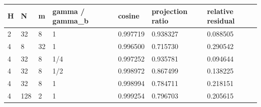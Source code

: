 \begin{tabular}{lllllll}
H & N & m & gamma / gamma\_b & cosine & projection ratio & relative residual \\
\hline
2 & 32 & 8 & 1 & 0.997719 & 0.938327 & 0.088505 \\
4 & 8 & 32 & 1 & 0.996500 & 0.715730 & 0.290542 \\
4 & 32 & 8 & 1/4 & 0.997252 & 0.935781 & 0.094644 \\
4 & 32 & 8 & 1/2 & 0.998972 & 0.867499 & 0.138225 \\
4 & 32 & 8 & 1 & 0.998994 & 0.784711 & 0.218151 \\
4 & 128 & 2 & 1 & 0.999254 & 0.796703 & 0.205615 \\
\end{tabular}
